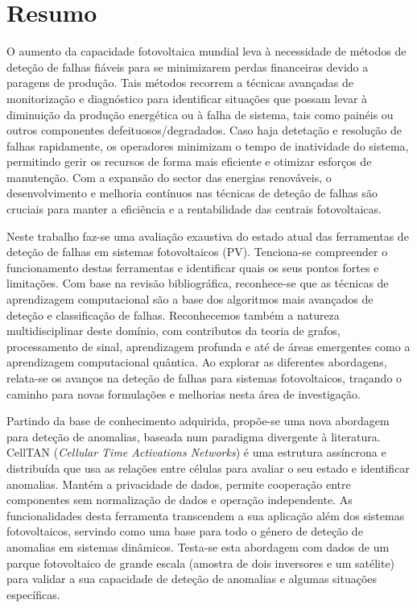\chapter*{Resumo}

O aumento da capacidade fotovoltaica mundial leva à necessidade de métodos de deteção de falhas fiáveis para se minimizarem perdas financeiras devido a paragens de produção. Tais métodos recorrem a técnicas avançadas de monitorização e diagnóstico para identificar situações que possam levar à diminuição da produção energética ou à falha de sistema, tais como painéis ou outros componentes defeituosos/degradados. Caso haja detetação e resolução de falhas rapidamente, os operadores minimizam o tempo de inatividade do sistema, permitindo gerir os recursos de forma mais eficiente e otimizar esforços de manutenção. Com a expansão do sector das energias renováveis, o desenvolvimento e melhoria contínuos nas técnicas de deteção de falhas são cruciais para manter a eficiência e a rentabilidade das centrais fotovoltaicas.

Neste trabalho faz-se uma avaliação exaustiva do estado atual das ferramentas de deteção de falhas em sistemas fotovoltaicos (PV). Tenciona-se compreender o funcionamento destas ferramentas e identificar quais os seus pontos fortes e limitações. Com base na revisão bibliográfica, reconhece-se que as técnicas de aprendizagem computacional são a base dos algoritmos mais avançados de deteção e classificação de falhas. Reconhecemos também a natureza multidisciplinar deste domínio, com contributos da teoria de grafos, processamento de sinal, aprendizagem profunda e até de áreas emergentes como a aprendizagem computacional quântica. Ao explorar as diferentes abordagens, relata-se os avanços na deteção de falhas para sistemas fotovoltaicos, traçando o caminho para novas formulações e melhorias nesta área de investigação.

Partindo da base de conhecimento adquirida, propõe-se uma nova abordagem para deteção de anomalias, baseada num paradigma divergente à literatura. CellTAN (\textit{Cellular Time Activations Networks}) é uma estrutura assíncrona e distribuída que usa as relações entre células para avaliar o seu estado e identificar anomalias. Mantém a privacidade de dados, permite cooperação entre componentes sem normalização de dados e operação independente. As funcionalidades desta ferramenta transcendem a sua aplicação além dos sistemas fotovoltaicos, servindo como uma base para todo o género de deteção de anomalias em sistemas dinâmicos.
Testa-se esta abordagem com dados de um parque fotovoltaico de grande escala (amostra de dois inversores e um satélite) para validar a sua capacidade de deteção de anomalias e algumas situações específicas.

